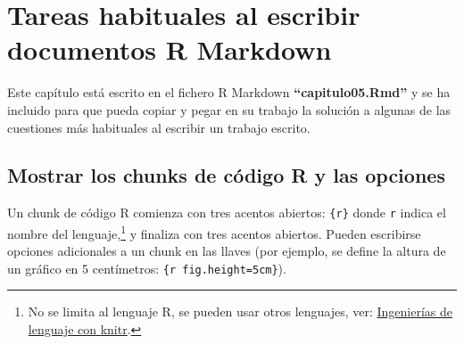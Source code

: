\documentclass[12pt,a4paper,]{book}
\def\ifdoblecara{} %
\def\ifprincipal{} %
\let\rmarkdownfootnote\footnote%
\def\footnote{\protect\rmarkdownfootnote}
\numberwithin{dummy}{section}
\theoremstyle{ocrenumbox}
\theoremstyle{blacknumex}
\theoremstyle{blacknumbox}
\theoremstyle{ocrenum}
\theoremstyle{ocrenum}
\begin{document}
\FloatBarrier 

\ifdefined\ifprincipal
\else
\setlength{\parindent}{1em}
\pagestyle{fancy}
\setcounter{tocdepth}{4}
\tableofcontents

\nocite{Luque2017,MongoDB,RStudio,R-base,
  R-knitr,R-rmarkdown,R-dplyr,Python2020}

\fi

\ifdefined\ifdoblecara
\fancyhead{}{}
\fancyhead[LE,RO]{\scriptsize\rightmark}
\fancyfoot[LO,RE]{\scriptsize\slshape \leftmark}
\fancyfoot[C]{}
\fancyfoot[LE,RO]{\footnotesize\thepage}
\else
\fancyhead{}{}
\fancyhead[RO]{\scriptsize\rightmark}
\fancyfoot[LO]{\scriptsize\slshape \leftmark}
\fancyfoot[C]{}
\fancyfoot[RO]{\footnotesize\thepage}
\fi

\renewcommand{\headrulewidth}{0.4pt}
\renewcommand{\footrulewidth}{0.4pt}

\hypertarget{tareas-habituales-al-escribir-documentos-r-markdown}{%
\chapter{Tareas habituales al escribir documentos R
Markdown}\label{tareas-habituales-al-escribir-documentos-r-markdown}}

Este capítulo está escrito en el fichero R Markdown
\textbf{``capitulo05.Rmd''} y se ha incluido para que pueda copiar y
pegar en su trabajo la solución a algunas de las cuestiones más
habituales al escribir un trabajo escrito.

\hypertarget{mostrar-los-chunks-de-cuxf3digo-r-y-las-opciones}{%
\section{Mostrar los chunks de código R y las
opciones}\label{mostrar-los-chunks-de-cuxf3digo-r-y-las-opciones}}

Un chunk de código R comienza con tres acentos abiertos:
\texttt{\textasciigrave{}\textasciigrave{}\textasciigrave{}\{r\}} donde
\texttt{r} indica el nombre del lenguaje,\footnote{No se limita al
  lenguaje R, se pueden usar otros lenguajes, ver:
  \href{https://rmarkdown.rstudio.com/authoring_knitr_engines.html\%23sql}{Ingenierías
  de lenguaje con knitr}.} y finaliza con tres acentos abiertos. Pueden
escribirse opciones adicionales a un chunk en las llaves (por ejemplo,
se define la altura de un gráfico en 5 centímetros:
\texttt{\textasciigrave{}\textasciigrave{}\textasciigrave{}\{r\ fig.height=\textquotesingle{}5cm\textquotesingle{}\}}).
\end{document}
